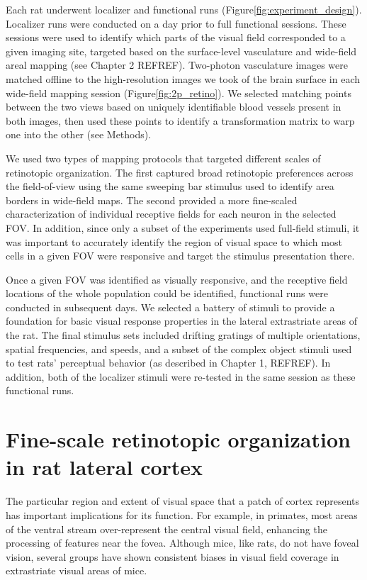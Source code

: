 Each rat underwent localizer and functional runs (Figure\ref{fig:experiment_design}). Localizer runs were conducted on a day prior to full functional sessions. These sessions were used to identify which parts of the visual field corresponded to a given imaging site, targeted based on the surface-level vasculature and wide-field areal mapping (see Chapter 2 REFREF). Two-photon vasculature images were matched offline to the high-resolution images we took of the brain surface in each wide-field mapping session (Figure\ref{fig:2p_retino}). We selected matching points between the two views based on uniquely identifiable blood vessels present in both images, then used these points to identify a transformation matrix to warp one into the other (see Methods).


We used two types of mapping protocols that targeted different scales of retinotopic organization. The first captured broad retinotopic preferences across the field-of-view using the same sweeping bar stimulus used to identify area borders in wide-field maps. The second provided a more fine-scaled characterization of individual receptive fields for each neuron in the selected FOV. In addition, since only a subset of the experiments used full-field stimuli, it was important to accurately identify the region of visual space to which most cells in a given FOV were responsive and target the stimulus presentation there. 

Once a given FOV was identified as visually responsive, and the receptive field locations of the whole population could be identified, functional runs were conducted in subsequent days. We selected a battery of stimuli to provide a foundation for basic visual response properties in the lateral extrastriate areas of the rat. The final stimulus sets included drifting gratings of multiple orientations, spatial frequencies, and speeds, and a subset of the complex object stimuli used to test rats' perceptual behavior (as described in Chapter 1, REFREF). In addition, both of the localizer stimuli were re-tested in the same session as these functional runs.


\section{Fine-scale retinotopic organization in rat lateral cortex}
The particular region and extent of visual space that a patch of cortex represents has important implications for its function. For example, in primates, most areas of the ventral stream over-represent the central visual field, enhancing the processing of features near the fovea\cite{REFREF, Gattass2005CorticalDynamics}. Although mice, like rats, do not have foveal vision, several groups have shown consistent biases in visual field coverage in extrastriate visual areas of mice\cite{Garrett2014, Marshel2011, REFREF}. 

